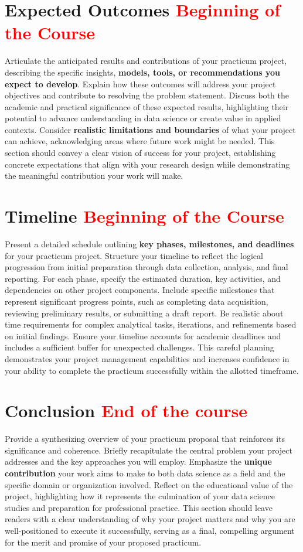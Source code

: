 \documentclass[12pt, onecolumn]{IEEEtran}
\begin{document}
\section{Expected Outcomes \textcolor{red}{Beginning of the Course}}
Articulate the anticipated results and contributions of your practicum project, describing the specific insights, \textbf{models, tools, or recommendations you expect to develop}. Explain how these outcomes will address your project objectives and contribute to resolving the problem statement. Discuss both the academic and practical significance of these expected results, highlighting their potential to advance understanding in data science or create value in applied contexts. Consider \textbf{realistic limitations and boundaries} of what your project can achieve, acknowledging areas where future work might be needed. This section should convey a clear vision of success for your project, establishing concrete expectations that align with your research design while demonstrating the meaningful contribution your work will make.

\section{Timeline \textcolor{red}{Beginning of the Course}}
Present a detailed schedule outlining \textbf{key phases, milestones, and deadlines} for your practicum project. Structure your timeline to reflect the logical progression from initial preparation through data collection, analysis, and final reporting. For each phase, specify the estimated duration, key activities, and dependencies on other project components. Include specific milestones that represent significant progress points, such as completing data acquisition, reviewing preliminary results, or submitting a draft report. Be realistic about time requirements for complex analytical tasks, iterations, and refinements based on initial findings. Ensure your timeline accounts for academic deadlines and includes a sufficient buffer for unexpected challenges. This careful planning demonstrates your project management capabilities and increases confidence in your ability to complete the practicum successfully within the allotted timeframe.

\section{Conclusion \textcolor{red}{End of the course}}
Provide a synthesizing overview of your practicum proposal that reinforces its significance and coherence. Briefly recapitulate the central problem your project addresses and the key approaches you will employ. Emphasize the \textbf{unique contribution} your work aims to make to both data science as a field and the specific domain or organization involved. Reflect on the educational value of the project, highlighting how it represents the culmination of your data science studies and preparation for professional practice. This section should leave readers with a clear understanding of why your project matters and why you are well-positioned to execute it successfully, serving as a final, compelling argument for the merit and promise of your proposed practicum.
\end{document}
